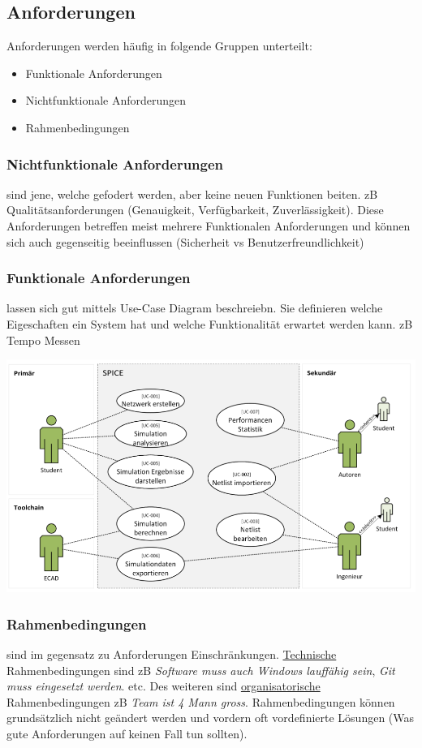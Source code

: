 \subsection{Anforderungen}
Anforderungen werden häufig in folgende Gruppen unterteilt: 
\begin{itemize}[nosep]
	\item Funktionale Anforderungen
	\item Nichtfunktionale Anforderungen
	\item Rahmenbedingungen
\end{itemize}

\subsubsection{Nichtfunktionale Anforderungen} sind jene, welche gefodert werden, aber keine neuen Funktionen beiten. zB Qualitätsanforderungen (Genauigkeit, Verfügbarkeit, Zuverlässigkeit). Diese Anforderungen betreffen meist mehrere Funktionalen Anforderungen und können sich auch gegenseitig beeinflussen (Sicherheit vs Benutzerfreundlichkeit)

\subsubsection{Funktionale Anforderungen} lassen sich gut mittels Use-Case Diagram beschreiebn. Sie definieren welche Eigeschaften ein System hat und welche Funktionalität erwartet werden kann. zB Tempo Messen
\begin{center}
	\includegraphics[width=\columnwidth]{Images/usecase}
\end{center}


\subsubsection{Rahmenbedingungen} sind im gegensatz zu Anforderungen Einschränkungen. \underline{Technische} Rahmenbedingungen sind zB \textit{Software muss auch Windows lauffähig sein}, \textit{Git muss eingesetzt werden}. etc. Des weiteren sind \underline{organisatorische} Rahmenbedingungen zB \textit{Team ist 4 Mann gross}. Rahmenbedingungen können grundsätzlich nicht geändert werden und vordern oft vordefinierte Lösungen (Was gute Anforderungen auf keinen Fall tun sollten).

